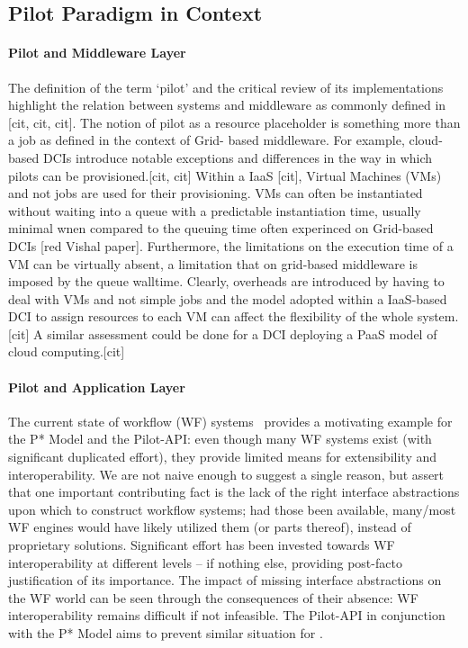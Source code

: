 \documentclass{sig-alternate}
\begin{document}
\subsection{Pilot Paradigm in Context}
\label{sec:5.2}

\paragraph*{Pilot and Middleware Layer} The definition of the term
`pilot' and the critical review of its implementations highlight the
relation between \pilot systems and middleware as commonly defined in
[cit, cit, cit]. The notion of pilot as a resource placeholder is
something more than a job as defined in the context of Grid- based
middleware. For example, cloud-based DCIs  introduce notable exceptions
and differences in the way in which pilots can be provisioned.[cit, cit]
Within a IaaS [cit], Virtual Machines (VMs) and not jobs are used for
their provisioning. VMs can often be instantiated without waiting into a
queue  with a predictable instantiation time, usually minimal wnen
compared to the queuing time often experinced on Grid-based DCIs [red
Vishal paper]. Furthermore, the limitations on the execution time of a
VM can be virtually absent, a limitation that on grid-based middleware
is imposed by the queue walltime. Clearly, overheads are introduced by
having to deal with VMs and not simple jobs and the model adopted within
a IaaS-based DCI to assign resources to each VM can affect the
flexibility of the whole \pilotjob system. [cit] A similar assessment
could be done for a DCI deploying a PaaS model of cloud computing.[cit]

\paragraph*{Pilot and Application Layer} The current state of workflow
(WF) systems~\cite{nsf-workflow,1196459} provides a motivating example
for the P* Model and the Pilot-API: even though many WF systems exist
(with significant duplicated effort), they provide limited means for
extensibility and interoperability.  We are not naive enough to suggest
a single reason, but assert that one important contributing fact is the
lack of the right interface abstractions upon which to construct
workflow systems; had those been available, many/most WF engines would
have likely utilized them (or parts thereof), instead of proprietary
solutions. Significant effort has been invested towards WF
interoperability at different levels -- if nothing else, providing
post-facto justification of its importance. The impact of missing
interface abstractions on the WF world can be seen through the
consequences of their absence: WF interoperability remains difficult if
not infeasible. The Pilot-API in conjunction with the P* Model aims to
prevent similar situation for \pilotjobs.
\end{document}
